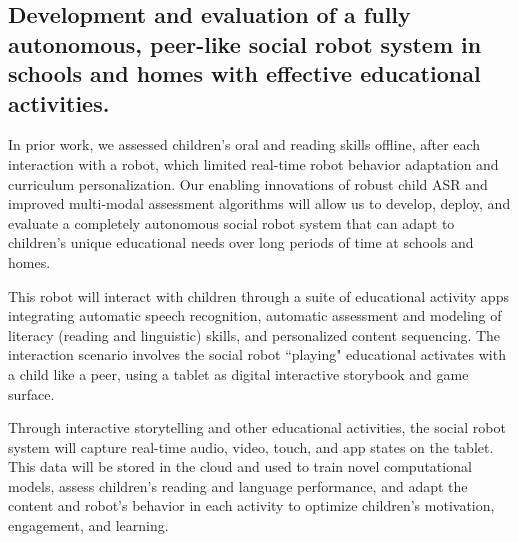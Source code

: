 
\subsection {Development and evaluation of a fully autonomous, peer-like social robot system in schools and homes with effective educational activities.}

In prior work, we assessed children's oral and reading skills offline, after each interaction with a robot, which limited real-time robot behavior adaptation and curriculum personalization. Our enabling innovations of robust child ASR and improved multi-modal assessment algorithms will allow us to develop, deploy, and evaluate a completely autonomous social robot system that can adapt to children's unique educational needs over long periods of time at schools and homes.


This robot will interact with children through a suite of educational activity apps integrating automatic speech recognition, automatic assessment and modeling of literacy (reading and linguistic) skills, and personalized content sequencing. The interaction scenario involves the social robot ``playing" educational activates with a child like a peer, using a tablet as digital interactive storybook and game surface.

Through interactive storytelling and other educational activities, the social robot system will capture real-time audio, video, touch, and app states on the tablet. This data will be stored in the cloud and used to train novel computational models, assess children's reading and language performance, and adapt the content and robot's behavior in each activity to optimize children's motivation, engagement, and learning. 

\vspace{-4mm}   
